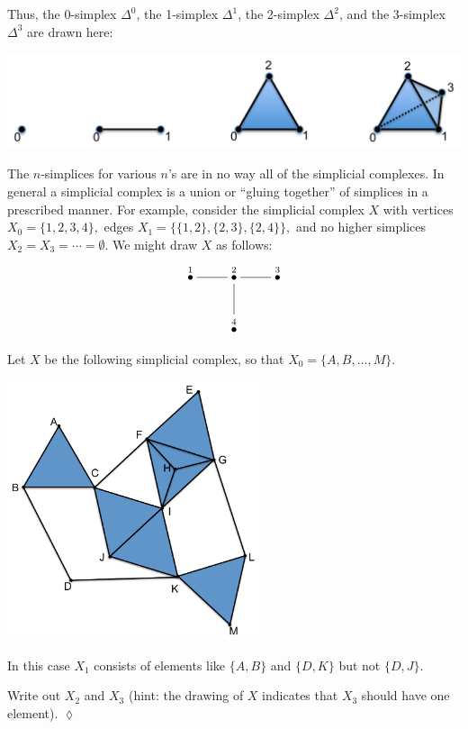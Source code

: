 \documentclass[a4paper]{book}
\newcommand{\LMO}[1]{\stackrel{#1}{\bullet}}
\theoremstyle{myth}
\newtheorem{excENG}[envENG]{\begin{english}Exercise\end{english}}
\newenvironment{exerciseENG}{\begin{excENG}}{\hspace*{\fill}$\lozenge$\end{excENG}}
\begin{document}
\begin{russian}
Thus, the 0-simplex $\Delta^0$, the 1-simplex $\Delta^1$, the 2-simplex $\Delta^2$, and the 3-simplex $\Delta^3$ are drawn here:
\begin{center}
\includegraphics[height=1.1in]{simplices}
\end{center} 

 

The $n$-simplices for various $n$'s are in no way all of the simplicial complexes. In general a simplicial complex is a union or “gluing together” of simplices in a prescribed manner. For example, consider the simplicial complex $X$ with vertices $X_0=\{1,2,3,4\},$ edges $X_1=\{\{1,2\},\{2,3\},\{2,4\}\},$ and no higher simplices $X_2=X_3=\cdots=\emptyset$. We might draw $X$ as follows:
$$\xymatrix{\LMO{1}\ar@{-}[r]&\LMO{2}\ar@{-}[r]\ar@{-}[d]&\LMO{3}\\&\LMO{4}}$$

 

\begin{exerciseENG}
Let $X$ be the following simplicial complex, so that $X_0=\{A,B,\ldots,M\}$. 
\begin{center}
\includegraphics[height=3in]{OlogNetwork5}
\end{center} 
In this case $X_1$ consists of elements like $\{A,B\}$ and $\{D,K\}$ but not $\{D,J\}$. 

Write out $X_2$ and $X_3$ (hint: the drawing of $X$ indicates that $X_3$ should have one element).
\end{exerciseENG}


\end{russian}
\end{document}

